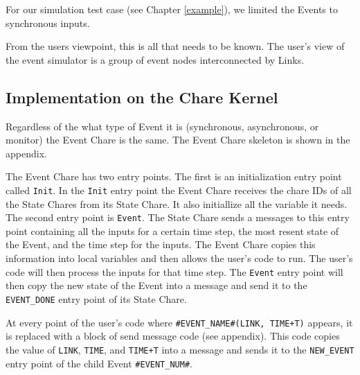 For our simulation test case (see Chapter \ref{example}), we limited the
Events to synchronous inputs.

From the users viewpoint, this is all that needs to be known.  The
user's view of the \dispare event simulator is a group of event nodes
interconnected by Links.

\subsection{Implementation on the Chare Kernel}

Regardless of the what type of Event it is (synchronous, asynchronous,
or monitor) the Event Chare is the same.  The Event Chare skeleton is
shown in the appendix.

The Event Chare has two entry points.  The first is an initialization
entry point called {\tt Init}.  In the {\tt Init} entry point the
Event Chare receives the chare IDs of all the State Chares from its
State Chare.  It also initiallize all the variable it needs.  The
second entry point is {\tt Event}.  The State Chare sends a messages
to this entry point containing all the inputs for a certain time step,
the most resent state of the Event, and the time step for the inputs.
The Event Chare copies this information into local variables and then
allows the user's code to run.  The user's code will then process the
inputs for that time step.  The {\tt Event} entry point will then copy
the new state of the Event into a message and send it to the {\tt
EVENT\_DONE} entry point of its State Chare.

At every point of the user's code where {\tt \#EVENT\_NAME\#(LINK,
TIME+T)} appears, it is replaced with a block of send message code
(see appendix).  This code copies the value of {\tt LINK}, {\tt TIME},
and {\tt TIME+T} into a message and sends it to the {\tt NEW\_EVENT}
entry point of the child Event {\tt \#EVENT\_NUM\#}.




